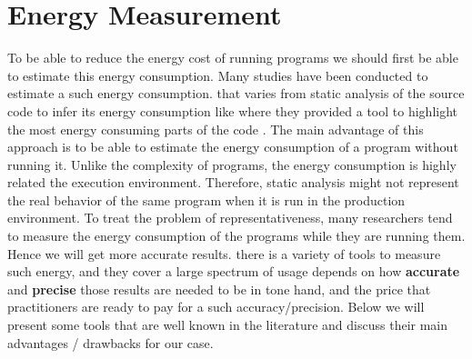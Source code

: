 

\section{Energy Measurement}
To be able to reduce the energy cost of running programs we should first be able to estimate this energy consumption.
Many studies have been conducted to estimate a such energy consumption. that varies from static analysis of the source code to infer its energy consumption like \citeauthor{pereira_helping_2017} where they provided a tool to highlight the most energy consuming parts of the code \cite{pereira_helping_2017}.
The main advantage of this approach is to be able to estimate the energy consumption of a program without running it.
Unlike the complexity of programs, the energy consumption is highly related the execution environment.
Therefore, static analysis might not represent the real behavior of the same program when it is run in the production environment.
To treat the problem of representativeness, many researchers tend to measure the energy consumption of the programs while they are running them. Hence we will get more accurate results.
there is a variety of tools to measure such energy, and they cover a large spectrum of usage depends on how \textbf{accurate} and \textbf{precise} those results are needed to be in tone hand, and the price that practitioners are ready to pay for a such accuracy/precision.
Below we will present some tools that are well known in the literature and discuss their main advantages / drawbacks for our case.



